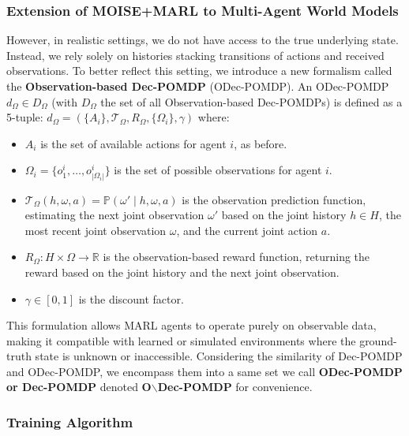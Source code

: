 \documentclass[pdflatex,sn-mathphys-num]{sn-jnl}%
\theoremstyle{thmstyleone}%
\theoremstyle{thmstyletwo}%
\theoremstyle{thmstylethree}%
\begin{document}
\subsubsection{Extension of MOISE+MARL to Multi-Agent World Models}

\noindent However, in realistic settings, we do not have access to the true underlying state. Instead, we rely solely on histories stacking transitions of actions and received observations. To better reflect this setting, we introduce a new formalism called the \textbf{Observation-based Dec-POMDP} (ODec-POMDP).
%
An ODec-POMDP $d_\Omega \in D_\Omega$ (with $D_\Omega$ the set of all Observation-based Dec-POMDPs) is defined as a 5-tuple:
%
$d_\Omega = \left(\{A_i\}, \mathcal{T}_\Omega, R_\Omega, \{\Omega_i\}, \gamma \right)$
%
where:
\begin{itemize}
    \item $A_i$ is the set of available actions for agent $i$, as before.
    \item $\Omega_i = \{o_1^i, \dots, o_{|\Omega_i|}^i\}$ is the set of possible observations for agent $i$.
    \item $\mathcal{T}_\Omega(h, \omega, a) = \mathbb{P}(\omega' \mid h, \omega, a)$ is the observation prediction function, estimating the next joint observation $\omega'$ based on the joint history $h \in H$, the most recent joint observation $\omega$, and the current joint action $a$.
    \item $R_\Omega: H \times \Omega \rightarrow \mathbb{R}$ is the observation-based reward function, returning the reward based on the joint history and the next joint observation.
    \item $\gamma \in [0, 1]$ is the discount factor.
\end{itemize}

\noindent This formulation allows MARL agents to operate purely on observable data, making it compatible with learned or simulated environments where the ground-truth state is unknown or inaccessible. Considering the similarity of Dec-POMDP and ODec-POMDP, we encompass them into a same set we call \textbf{ODec-POMDP or Dec-POMDP} denoted \textbf{O$\backslash$Dec-POMDP} for convenience.




\subsubsection*{Training Algorithm}
\end{document}
